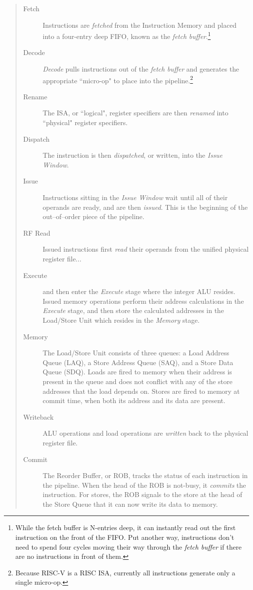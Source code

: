 \begin{quote}
\begin{description}
\item[Fetch]  Instructions are {\em fetched} from the Instruction Memory and placed into a four-entry deep FIFO, known as the {\em fetch buffer}.\footnote{While the fetch buffer is N-entries deep, it can instantly read out the first instruction on the front of the FIFO.  Put another way, instructions don't need to spend four cycles moving their way through the {\em fetch buffer} if there are no instructions in front of them.}
\item[Decode]
{\em Decode} pulls instructions out of the {\em fetch buffer} and generates the appropriate ``micro-op" to place into the pipeline.\footnote{Because RISC-V is a RISC ISA, currently all instructions generate only a single micro-op.} 

\item[Rename]
 The ISA, or ``logical", register specifiers are then {\em renamed} into ``physical" register specifiers.
  
\item[Dispatch] The instruction is then {\em dispatched}, or written, into the {\em Issue Window}.  
 
\item[Issue]   Instructions sitting in the {\em Issue Window} wait until all of their operands are ready, and are then {\em issued}.  This is the beginning of the out--of--order piece of the pipeline.
\item[RF Read]  Issued instructions first {\em read} their operands from the unified physical register file... 
\item[Execute] and then enter the {\em Execute} stage where the integer ALU resides.  Issued memory operations perform their address calculations in the {\em Execute} stage, and then store the calculated addresses in the Load/Store Unit which resides in the {\em Memory} stage.  
 
\item[Memory]  The Load/Store Unit consists of three queues: a Load Address Queue (LAQ), a Store Address Queue (SAQ), and a Store Data Queue (SDQ).  Loads are fired to memory when their address is present in the queue and does not conflict with any of the store addresses that the load depends on. Stores are fired to memory at commit time, when both its address and its data are present.  
 
\item[Writeback]  ALU operations and load operations are {\em written} back to the physical register file.
\item[Commit] The Reorder Buffer, or ROB, tracks the status of each instruction in the pipeline.  When the head of the ROB is not-busy, it {\em commits} the instruction.  For stores, the ROB signals to the store at the head of the Store Queue that it can now write its data to memory.
\end{description}
\end{quote}



